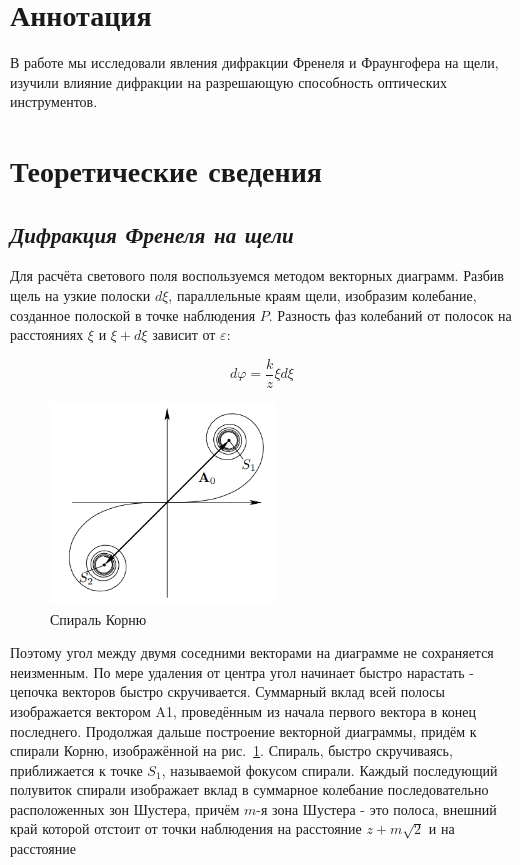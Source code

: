 \section*{Аннотация}
\indent В работе мы исследовали явления дифракции Френеля и Фраунгофера на щели, изучили влияние дифракции на разрешающую способность оптических инструментов.
\section*{Теоретические сведения}
\subsection*{\textit{Дифракция Френеля на щели}}

Для расчёта светового поля воспользуемся методом векторных диаграмм. Разбив щель на узкие полоски \( d\xi \), параллельные краям щели, изобразим колебание, созданное полоской в точке наблюдения \( P \). Разность фаз колебаний от полосок на расстояниях $\xi$ и $\xi + d\xi$
зависит от $\varepsilon$:

$$ d\varphi = \frac{k}{z}\xi d\xi$$

\begin{figure}
    \centering
    \includegraphics[width=6cm]{images/karnu.png}
    \caption{Спираль Корню}\label{fig:cornu}
\end{figure}

Поэтому угол между двумя соседними векторами на диаграмме не сохраняется неизменным.
По мере удаления от центра угол начинает быстро нарастать - цепочка векторов быстро скручивается.
Суммарный вклад всей полосы изображается вектором A1, проведённым из начала первого вектора в конец последнего.
Продолжая дальше построение векторной диаграммы, придём к спирали Корню, изображённой на рис.~\ref{fig:cornu}. Спираль, быстро скручиваясь, приближается к точке \(S_1\), называемой фокусом спирали. Каждый последующий полувиток спирали изображает вклад в суммарное колебание последовательно расположенных зон Шустера, причём \(m\)-я зона Шустера - это полоса, внешний край которой отстоит от точки наблюдения на расстояние \(z + m\sqrt{2}\) и на расстояние

